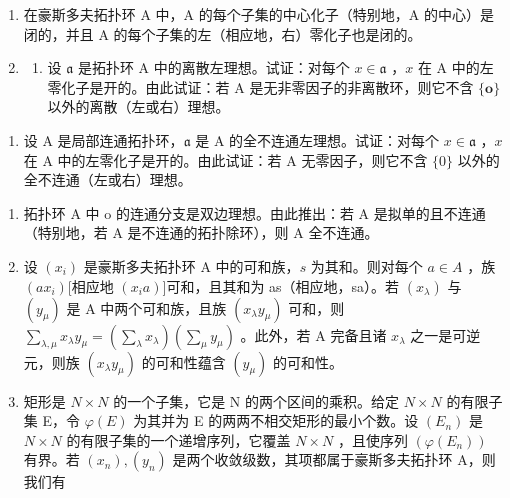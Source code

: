 \BourbakiExerciseGroup

\begin{enumerate}
\def\labelenumi{\arabic{enumi})}
\item
  在豪斯多夫拓扑环 A 中，A 的每个子集的中心化子（特别地，A 的中心）是闭的，并且 A 的每个子集的左（相应地，右）零化子也是闭的。
\item
  \begin{enumerate}
  \def\labelenumii{\alph{enumii})}
  \tightlist
  \item
    设 \(\mathfrak{a}\) 是拓扑环 A 中的离散左理想。试证：对每个 \(x \in \mathfrak{a}\) ，\(x\) 在 A 中的左零化子是开的。由此试证：若 A 是无非零因子的非离散环，则它不含 \(\{\mathbf{o}\}\) 以外的离散（左或右）理想。
  \end{enumerate}
\end{enumerate}

\begin{enumerate}
\def\labelenumi{\alph{enumi})}
\setcounter{enumi}{1}
\tightlist
\item
  设 A 是局部连通拓扑环，\(\mathfrak{a}\) 是 A 的全不连通左理想。试证：对每个 \(x \in \mathfrak{a}\) ，\(x\) 在 A 中的左零化子是开的。由此试证：若 A 无零因子，则它不含 \(\{0\}\) 以外的全不连通（左或右）理想。
\end{enumerate}

\begin{enumerate}
\def\labelenumi{\arabic{enumi})}
\setcounter{enumi}{2}
\item
  拓扑环 A 中 o 的连通分支是双边理想。由此推出：若 A 是拟单的且不连通（特别地，若 A 是不连通的拓扑除环），则 A 全不连通。
\item
  设 \((x_{i})\) 是豪斯多夫拓扑环 A 中的可和族，\(s\) 为其和。则对每个 \(a \in A\) ，族 \((ax_{i})\){[}相应地 \((x_{i}a)]\)可和，且其和为 as（相应地，sa）。若 \((x_{\lambda})\) 与 \((y_{\mu})\) 是 A 中两个可和族，且族 \((x_{\lambda}y_{\mu})\) 可和，则 \(\sum_{\lambda,\mu} x_{\lambda} y_{\mu} = \left( \sum_{\lambda} x_{\lambda} \right) \left( \sum_{\mu} y_{\mu} \right)\) 。此外，若 A 完备且诸 \(x_{\lambda}\) 之一是可逆元，则族 \((x_{\lambda}y_{\mu})\) 的可和性蕴含 \((y_{\mu})\) 的可和性。
\item
  矩形是 \(N \times N\) 的一个子集，它是 N 的两个区间的乘积。给定 \(N \times N\) 的有限子集 E，令 \(\varphi(E)\) 为其并为 E 的两两不相交矩形的最小个数。设 \((E_n)\) 是 \(N \times N\) 的有限子集的一个递增序列，它覆盖 \(N \times N\) ，且使序列 \((\varphi(E_n))\) 有界。若 \((x_n), (y_n)\) 是两个收敛级数，其项都属于豪斯多夫拓扑环 A，则我们有
\end{enumerate}

